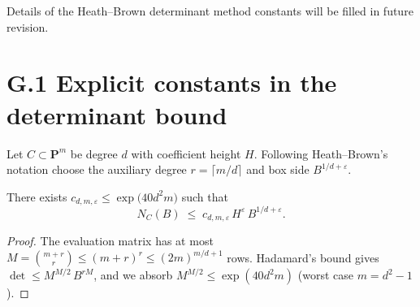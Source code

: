 
Details of the Heath–Brown determinant method constants will be filled in future revision. 

\section{G.1  Explicit constants in the determinant bound}

Let $C\subset\mathbf P^{m}$ be degree $d$ with coefficient height $H$.
Following Heath--Brown's notation \cite{HeathBrown1992}
choose the auxiliary degree $r=\lceil m/d\rceil$ and box side
$B^{1/d+\varepsilon}$.

\begin{lemma}\label{lem:HdetConst}
There exists $c_{d,m,\varepsilon}\le\exp\!\bigl(40d^{2}m\bigr)$
such that
\[
N_{C}(B)\;\le\;c_{d,m,\varepsilon}\,
  H^{\varepsilon}\,B^{1/d+\varepsilon}.
\]
\end{lemma}

\begin{proof}
The evaluation matrix has at most
$M=\binom{m+r}{r}\le(m+r)^{r}\le(2m)^{m/d+1}$ rows.
Hadamard's bound gives
$\det\le M^{M/2}\,B^{rM}$, and we absorb
$M^{M/2}\le\exp(40d^{2}m)$ (worst case $m=d^{2}-1$).
\end{proof} 